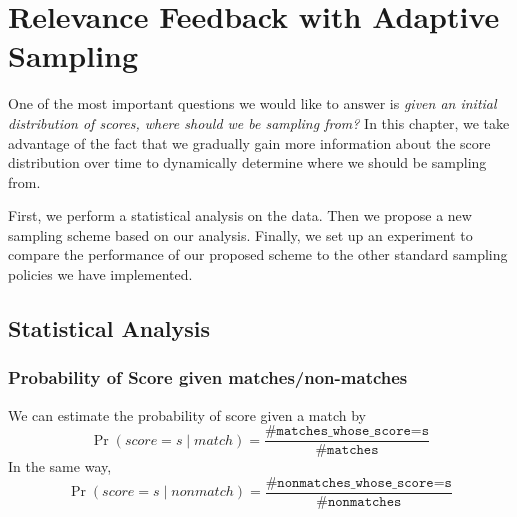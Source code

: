 \graphicspath{{images/chap6/}}
\chapter{Relevance Feedback with Adaptive Sampling}

One of the most important questions we would like to answer is \emph{given an
initial distribution of scores, where should we be sampling from?} In this
chapter, we take advantage of the fact that we gradually gain more
information about the score distribution over time to dynamically determine
where we should be sampling from.

First, we perform a statistical analysis on the data. Then we propose a
new sampling scheme based on our analysis. Finally, we set up an experiment to
compare the performance of our proposed scheme to the other standard sampling
policies we have implemented.

\section{Statistical Analysis}

\subsection{Probability of Score given matches/non-matches}

We can estimate the probability of score given a match by
$$\Pr{(score=s \mid match)} = \frac{\texttt{\# matches\_whose\_score=s}}
    {\texttt{\# matches}}$$
In the same way,
$$\Pr{(score=s \mid nonmatch)} = \frac{\texttt{\# nonmatches\_whose\_score=s}}
    {\texttt{\# nonmatches}}$$

